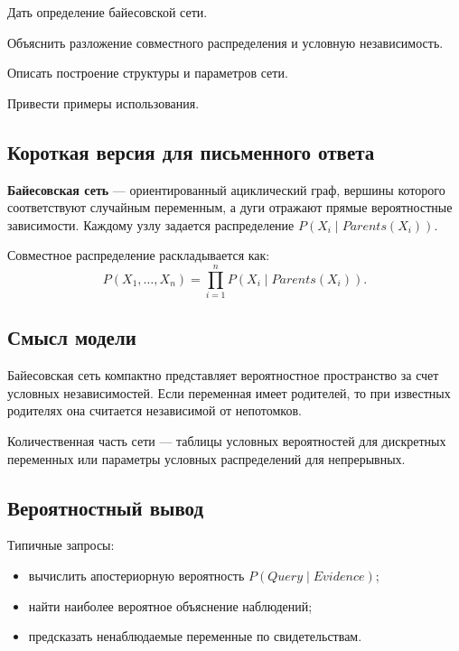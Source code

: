
\begin{examplan}
    \item Дать определение байесовской сети.
    \item Объяснить разложение совместного распределения и условную независимость.
    \item Описать построение структуры и параметров сети.
    \item Привести примеры использования.
\end{examplan}

\subsection*{Короткая версия для письменного ответа}

\textbf{Байесовская сеть} --- ориентированный ациклический граф, вершины которого соответствуют случайным переменным, а дуги отражают прямые вероятностные зависимости. Каждому узлу задается распределение $P(X_i\mid Parents(X_i))$.

Совместное распределение раскладывается как:
\[
P(X_1,\ldots,X_n)=\prod_{i=1}^{n}P(X_i\mid Parents(X_i)).
\]

\subsection*{Смысл модели}

Байесовская сеть компактно представляет вероятностное пространство за счет условных независимостей. Если переменная имеет родителей, то при известных родителях она считается независимой от непотомков.

Количественная часть сети --- таблицы условных вероятностей для дискретных переменных или параметры условных распределений для непрерывных.

\subsection*{Вероятностный вывод}

Типичные запросы:
\begin{itemize}
    \item вычислить апостериорную вероятность $P(Query\mid Evidence)$;
    \item найти наиболее вероятное объяснение наблюдений;
    \item предсказать ненаблюдаемые переменные по свидетельствам.
\end{itemize}

